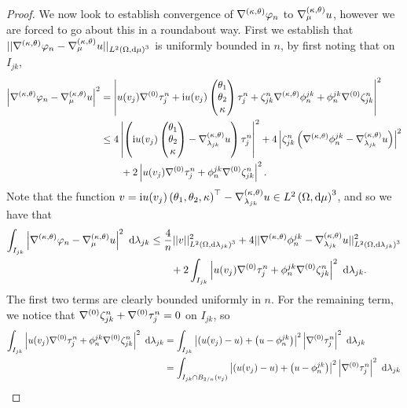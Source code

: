 \begin{proof}
	We now look to establish convergence of $\nabla^{\left( \kappa, \theta \right)}\varphi_n$ to $\nabla^{\left( \kappa, \theta \right)}_{\mu}u$, however we are forced to go about this in a roundabout way.
	First we establish that $\lvert\lvert \nabla^{\left( \kappa, \theta \right)}\varphi_n-\nabla^{\left( \kappa, \theta \right)}_{\mu}u \rvert\rvert_{L^{2}\left( \Omega,\mathrm{d} \mu \right)^3}$ is uniformly bounded in $n$, by first noting that on $I_{jk}$,
	\begin{align*}
		\left\lvert \nabla^{\left( \kappa, \theta \right)}\varphi_n - \nabla^{\left( \kappa, \theta \right)}_{\mu}u \right\rvert^2
		&= \left\lvert u(v_j)\nabla^{(0)}\tau_j^n + \mathrm{i} u(v_j)\begin{pmatrix} \theta_1 \\ \theta_2 \\ \kappa \end{pmatrix} \tau_j^n + \zeta_{jk}^n\nabla^{\left( \kappa, \theta \right)}\phi_n^{jk} + \phi_n^{jk}\nabla^{(0)}\zeta_{jk}^n \right\rvert^2 \\
		&\leq 4\left\lvert \left( \mathrm{i} u(v_j)\begin{pmatrix} \theta_1 \\ \theta_2 \\ \kappa \end{pmatrix}-\nabla^{\left( \kappa, \theta \right)}_{\lambda_{jk}}u \right)\tau_j^n \right\rvert^2 + 4\left\lvert \zeta_{jk}^n\left( \nabla^{\left( \kappa, \theta \right)}\phi_n^{jk}-\nabla^{\left( \kappa, \theta \right)}_{\lambda_{jk}}u \right) \right\rvert^2 \\
		&\qquad + 2\left\lvert u(v_j)\nabla^{(0)}\tau_j^n + \phi_n^{jk}\nabla^{(0)}\zeta_{jk}^n \right\rvert^2.
	\end{align*}
	Note that the function $v = \mathrm{i} u(v_j)\left( \theta_1,\theta_2,\kappa \right)^\top - \nabla^{\left( \kappa, \theta \right)}_{\lambda_{jk}}u\in L^{2}\left( \Omega,\mathrm{d} \mu \right)^3$, and so we have that
	\begin{align*}
		\int_{I_{jk}} \left\lvert \nabla^{\left( \kappa, \theta \right)}\varphi_n - \nabla^{\left( \kappa, \theta \right)}_{\mu}u \right\rvert^2  \ \mathrm{d}\lambda_{jk}
		&\leq \frac{4}{n}\lvert\lvert v \rvert\rvert_{L^{2}\left( \Omega,\mathrm{d} \lambda_{jk} \right)^3}^2 + 4\lvert\lvert \nabla^{\left( \kappa, \theta \right)}\phi^{jk}_n 
		- \nabla^{\left( \kappa, \theta \right)}_{\lambda_{jk}}u \rvert\rvert_{L^{2}\left( \Omega,\mathrm{d} \lambda_{jk} \right)^3}^2 \\
		&\qquad + 2\int_{I_{jk}} \left\lvert u(v_j)\nabla^{(0)}\tau_j^n + \phi_n^{jk}\nabla^{(0)}\zeta_{jk}^n \right\rvert^2  \ \mathrm{d}\lambda_{jk}.
	\end{align*}
	The first two terms are clearly bounded uniformly in $n$.
	For the remaining term, we notice that $\nabla^{(0)}\zeta_{jk}^n+\nabla^{(0)}\tau_j^n=0$ on $I_{jk}$, so 
	\begin{align*}
		\integral{I_{jk}}{ \abs{u(v_j)\ograd\tau_j^n + \phi_n^{jk}\ograd\zeta_{jk}^n}^2 }{\lambda_{jk}}
		&= \integral{I_{jk}}{ \abs{ \bracs{u(v_j)-u} + \bracs{u - \phi_n^{jk}} }^2\abs{ \ograd\tau_j^n }^2 }{\lambda_{jk}} \\
		&= \integral{I_{jk}\cap B_{2/n}(v_j)}{ \abs{ \bracs{u(v_j)-u} + \bracs{u - \phi_n^{jk}} }^2\abs{ \ograd\tau_j^n }^2 }{\lambda_{jk}} \\

\end{align*}
\end{proof}
